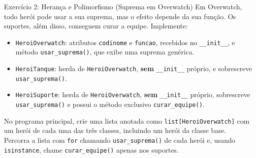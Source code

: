 \begin{exercicio}{Exercício 2: Herança e Polimorfismo (Suprema em Overwatch)}
Em Overwatch, todo herói pode usar a sua suprema, mas o efeito depende da sua função. Os
suportes, além disso, conseguem curar a equipe. Implemente:

\begin{itemize}
    \item \texttt{HeroiOverwatch}: atributos \texttt{codinome} e \texttt{funcao}, recebidos no
    \texttt{\_\_init\_\_}, e método \texttt{usar\_suprema()}, que exibe uma suprema genérica.

    \item \texttt{HeroiTanque}: herda de \texttt{HeroiOverwatch}, \textbf{sem}
    \texttt{\_\_init\_\_} próprio, e sobrescreve \texttt{usar\_suprema()}.

    \item \texttt{HeroiSuporte}: herda de \texttt{HeroiOverwatch}, \textbf{sem}
    \texttt{\_\_init\_\_} próprio, sobrescreve \texttt{usar\_suprema()} e possui o método
    exclusivo \texttt{curar\_equipe()}.
\end{itemize}

No programa principal, crie uma lista anotada como \texttt{list[HeroiOverwatch]} com um herói
de cada uma das três classes, incluindo um herói da classe base. Percorra a lista com
\texttt{for} chamando \texttt{usar\_suprema()} de cada herói e, usando \texttt{isinstance},
chame \texttt{curar\_equipe()} apenas nos suportes.
\end{exercicio}

